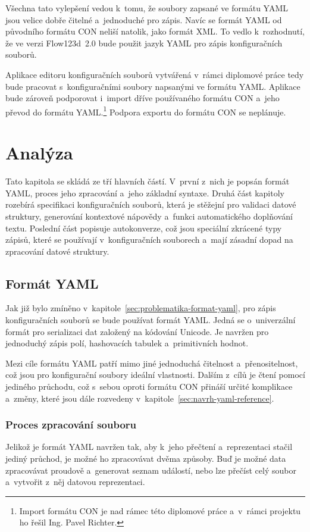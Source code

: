 \documentclass[FM,bw,DP]{tulthesis}
\begin{document}
Všechna tato vylepšení vedou k~tomu, že soubory zapsané ve formátu \gls{YAML} jsou velice dobře čitelné a~jednoduché pro zápis. Navíc se formát \gls{YAML} od původního formátu \gls{CON} neliší natolik, jako formát \gls{XML}. To vedlo k~rozhodnutí, že ve verzi Flow123d~2.0 bude použit jazyk \gls{YAML} pro zápis konfiguračních souborů.

Aplikace editoru konfiguračních souborů vytvářená v~rámci diplomové práce tedy bude pracovat s~konfiguračními soubory napsanými ve formátu \gls{YAML}. Aplikace bude zároveň podporovat i~import dříve používaného formátu \gls{CON} a~jeho převod do formátu \gls{YAML}.\footnote{Import formátu CON je nad rámec této diplomové práce a~v~rámci projektu ho řešil Ing. Pavel Richter.} Podpora exportu do formátu \gls{CON} se neplánuje.


\chapter{Analýza}

Tato kapitola se skládá ze tří hlavních částí. V~první z~nich je popsán formát \gls{YAML}, proces jeho zpracování a~jeho základní syntaxe. Druhá část kapitoly rozebírá specifikaci konfiguračních souborů, která je stěžejní pro validaci datové struktury, generování kontextové nápovědy a~funkci automatického doplňování textu. Poslední část popisuje autokonverze, což jsou speciální zkrácené typy zápisů, které se používají v~konfiguračních souborech a~mají zásadní dopad na zpracování datové struktury.


\section{Formát YAML}
Jak již bylo zmíněno v~kapitole~\ref{sec:problematika-format-yaml}, pro zápis konfiguračních souborů se bude používat formát \gls{YAML}. Jedná se o~univerzální formát pro serializaci dat založený na kódování Unicode. Je navržen pro jednoduchý zápis polí, hashovacích tabulek a~primitivních hodnot.

Mezi cíle formátu \gls{YAML} patří mimo jiné jednoduchá čitelnost a~přenositelnost, což jsou pro konfigurační soubory ideální vlastnosti. Dalším z~cílů je čtení pomocí jediného průchodu, což s~sebou oproti formátu \gls{CON} přináší určité komplikace a~změny, které jsou dále rozvedeny v~kapitole~\ref{sec:navrh-yaml-reference}.

\subsection{Proces zpracování souboru}
\label{sec:analyza-proces-zpracovani-yaml}
Jelikož je formát \gls{YAML} navržen tak, aby k~jeho přečtení a~reprezentaci stačil jediný průchod, je možné ho zpracovávat dvěma způsoby. Buď je možné data zpracovávat proudově a~generovat seznam událostí, nebo lze přečíst celý soubor a~vytvořit z~něj datovou reprezentaci.
\end{document}
